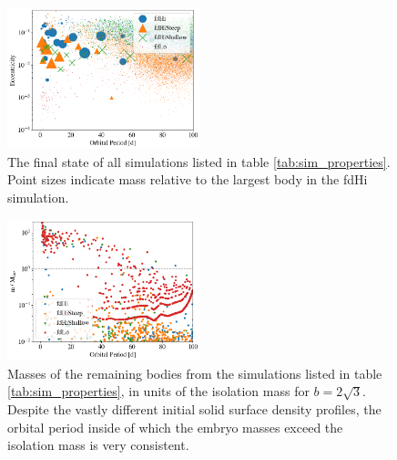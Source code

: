\documentclass[twocolumn]{aastex63}
\begin{document}
\begin{figure}
\begin{center}
    \includegraphics[width=0.5\textwidth]{figures/surfden_profiles.png}
    \caption{The final state of all simulations listed in table \ref{tab:sim_properties}. Point sizes indicate mass relative to the largest body in the fdHi simulation.\label{fig:surfden_profiles}}
\end{center}
\end{figure}

\begin{figure}
\begin{center}
    \includegraphics[width=0.5\textwidth]{figures/surfden_iso.png}
    \caption{Masses of the remaining bodies from the simulations listed in table \ref{tab:sim_properties}, in units of the isolation mass for $b = 2 \sqrt{3}$. Despite the vastly different initial solid surface density profiles, the orbital period inside of which the embryo masses exceed the isolation mass is very consistent.\label{fig:surfden_iso}}
\end{center}
\end{figure}

\end{document}
